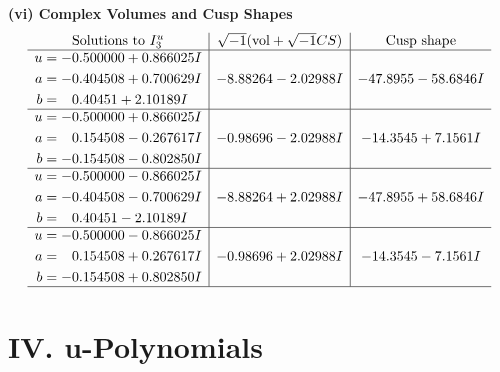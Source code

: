 \documentclass[1p]{elsarticle_modified}
\theoremstyle{definition}
\newcommand{\I}{\sqrt{-1}}
\begin{document}
\newpage\flushleft \textbf{(vi) Complex Volumes and Cusp Shapes}
$$\begin{array}{c|c|c}  
\text{Solutions to }I^u_{3}& \I (\text{vol} + \sqrt{-1}CS) & \text{Cusp shape}\\
 \hline 
\begin{aligned}
u &= -0.500000 + 0.866025 I \\
a &= -0.404508 + 0.700629 I \\
b &= \phantom{-}0.40451 + 2.10189 I\end{aligned}
 & -8.88264 - 2.02988 I & -47.8955 - 58.6846 I \\ \hline\begin{aligned}
u &= -0.500000 + 0.866025 I \\
a &= \phantom{-}0.154508 - 0.267617 I \\
b &= -0.154508 - 0.802850 I\end{aligned}
 & -0.98696 - 2.02988 I & -14.3545 + 7.1561 I \\ \hline\begin{aligned}
u &= -0.500000 - 0.866025 I \\
a &= -0.404508 - 0.700629 I \\
b &= \phantom{-}0.40451 - 2.10189 I\end{aligned}
 & -8.88264 + 2.02988 I & -47.8955 + 58.6846 I \\ \hline\begin{aligned}
u &= -0.500000 - 0.866025 I \\
a &= \phantom{-}0.154508 + 0.267617 I \\
b &= -0.154508 + 0.802850 I\end{aligned}
 & -0.98696 + 2.02988 I & -14.3545 - 7.1561 I\\
 \hline 
 \end{array}$$\newpage
\newpage\renewcommand{\arraystretch}{1}
\centering \section*{ IV. u-Polynomials}
\end{document}
